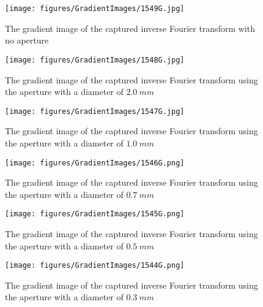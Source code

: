 \begin{figure}[H]
    \centering
    \begin{minipage}{0.45\textwidth}
        \centering
        \texttt{[image: figures/GradientImages/1549G.jpg]}
        \caption{The gradient image of the captured inverse Fourier transform with no aperture}
    \end{minipage}%
    \hspace{0.75cm}
    \begin{minipage}{0.45\textwidth}
        \centering
        \texttt{[image: figures/GradientImages/1548G.jpg]}
        \caption{The gradient image of the captured inverse Fourier transform using the aperture with a diameter of $2.0 \ \si{mm}$}
    \end{minipage}%
    \vspace{1cm}
    \begin{minipage}{0.45\textwidth}
        \centering
        \texttt{[image: figures/GradientImages/1547G.jpg]}
        \caption{The gradient image of the captured inverse Fourier transform using the aperture with a diameter of $1.0 \ \si{mm}$}
    \end{minipage}%
    \hspace{0.75cm}
    \begin{minipage}{0.45\textwidth}
        \centering
        \texttt{[image: figures/GradientImages/1546G.png]}
        \caption{The gradient image of the captured inverse Fourier transform using the aperture with a diameter of $0.7 \ \si{mm}$}
    \end{minipage}%
    \vspace{1cm}
    \begin{minipage}{0.45\textwidth}
        \centering
        \texttt{[image: figures/GradientImages/1545G.png]}
        \caption{The gradient image of the captured inverse Fourier transform using the aperture with a diameter of $0.5 \ \si{mm}$}
    \end{minipage}%
    \hspace{0.75cm}
    \begin{minipage}{0.45\textwidth}
        \centering
        \texttt{[image: figures/GradientImages/1544G.png]}
        \caption{The gradient image of the captured inverse Fourier transform using the aperture with a diameter of $0.3 \ \si{mm}$}
    \end{minipage}%
\end{figure}